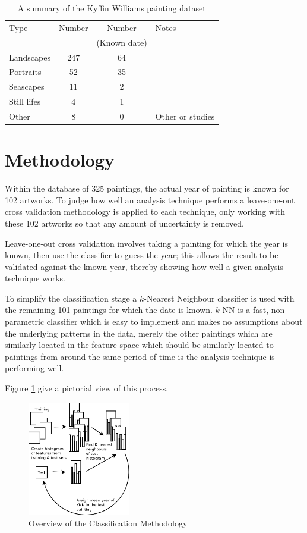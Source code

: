 \begin{table}[h]
\centering
\begin{tabular}{| l | c | c | p{3cm} |}
\hline
Type & Number & Number & Notes \\
  & & (Known date) &  \\
\hline
Landscapes  & 247 & 64 & \\
Portraits   &  52 & 35 & \\
Seascapes   &  11 &  2 & \\
Still lifes &   4 &  1 & \\
Other       &   8 &  0 & Other or studies \\
\hline
\end{tabular}
\caption{A summary of the Kyffin Williams painting dataset
\label{summary_t}}
\end{table}

\section{Methodology}

Within the database of 325 paintings, the actual year of painting is known for 102 artworks. 
To judge how well an analysis technique performs a leave-one-out cross validation methodology is
applied to each technique, only working with these 102 artworks so that any amount of uncertainty 
is removed.

Leave-one-out cross validation involves taking a painting for which the year is known, then use
the classifier to guess the year; this allows the result to be validated against the known year,
thereby showing how well a given analysis technique works.

To simplify the classification stage a $k$-Nearest Neighbour classifier is used with the remaining
101 paintings for which the date is known. $k$-NN is a fast, non-parametric classifier
which is easy to implement and makes no assumptions about the underlying patterns in the data, 
merely the other paintings which are similarly located in the feature space which should be 
similarly located to paintings from around the same period of time is the analysis technique is
performing well.

Figure \ref{img:classification-overview} give a pictorial view of this process.

\begin{figure}[h]
\centering
\includegraphics[width=0.4\textwidth]{img/kyffin_overview.pdf}
\caption{Overview of the Classification Methodology}
\label{img:classification-overview}
\end{figure}


